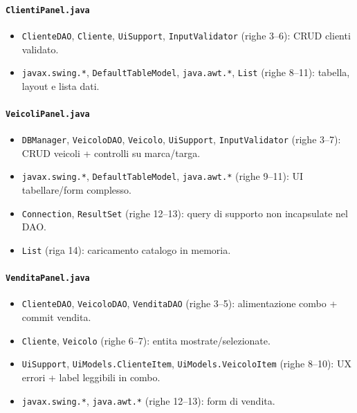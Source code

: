 \documentclass[12pt,a4paper]{article}
\begin{document}
\paragraph{\texttt{ClientiPanel.java}}
\begin{itemize}
  \item \texttt{ClienteDAO}, \texttt{Cliente}, \texttt{UiSupport}, \texttt{InputValidator} (righe 3--6): CRUD clienti validato.
  \item \texttt{javax.swing.*}, \texttt{DefaultTableModel}, \texttt{java.awt.*}, \texttt{List} (righe 8--11): tabella, layout e lista dati.
\end{itemize}

\paragraph{\texttt{VeicoliPanel.java}}
\begin{itemize}
  \item \texttt{DBManager}, \texttt{VeicoloDAO}, \texttt{Veicolo}, \texttt{UiSupport}, \texttt{InputValidator} (righe 3--7): CRUD veicoli + controlli su marca/targa.
  \item \texttt{javax.swing.*}, \texttt{DefaultTableModel}, \texttt{java.awt.*} (righe 9--11): UI tabellare/form complesso.
  \item \texttt{Connection}, \texttt{ResultSet} (righe 12--13): query di supporto non incapsulate nel DAO.
  \item \texttt{List} (riga 14): caricamento catalogo in memoria.
\end{itemize}

\paragraph{\texttt{VenditaPanel.java}}
\begin{itemize}
  \item \texttt{ClienteDAO}, \texttt{VeicoloDAO}, \texttt{VenditaDAO} (righe 3--5): alimentazione combo + commit vendita.
  \item \texttt{Cliente}, \texttt{Veicolo} (righe 6--7): entita mostrate/selezionate.
  \item \texttt{UiSupport}, \texttt{UiModels.ClienteItem}, \texttt{UiModels.VeicoloItem} (righe 8--10): UX errori + label leggibili in combo.
  \item \texttt{javax.swing.*}, \texttt{java.awt.*} (righe 12--13): form di vendita.
\end{itemize}
\end{document}
